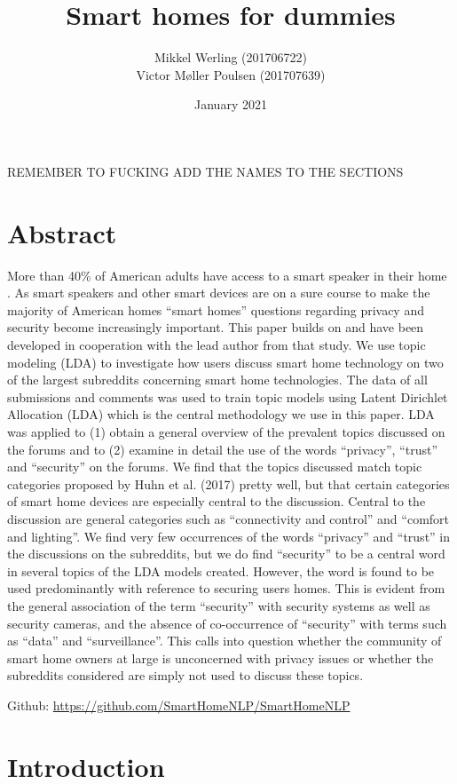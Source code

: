 \documentclass{article}
\title{Smart homes for dummies}
\author{Mikkel Werling (201706722) \\ Victor Møller Poulsen (201707639)}
\date{January 2021}
\begin{document}
    \maketitle
    REMEMBER TO FUCKING ADD THE NAMES TO THE SECTIONS 
    \section{Abstract}
    More than 40\% of American adults have access to a smart speaker in their home \cite{perez_smart_2018}. As smart speakers and other smart devices are on a sure course to make the majority of American homes “smart homes” questions regarding privacy and security become increasingly important. This paper builds on  and have been developed in cooperation with the lead author from that study. We use topic modeling (LDA) to investigate how users discuss smart home technology on two of the largest subreddits concerning smart home technologies. The data of all submissions and comments was used to train topic models using Latent Dirichlet Allocation (LDA) which is the central methodology we use in this paper. LDA was applied to (1) obtain a general overview of the prevalent topics discussed on the forums and to (2) examine in detail the use of the words “privacy”, “trust” and “security” on the forums. We find that the topics discussed match topic categories proposed by Huhn et al. (2017) pretty well, but that certain categories of smart home devices are especially central to the discussion. Central to the discussion are general categories such as “connectivity and control” and “comfort and lighting”. We find very few occurrences of the words “privacy” and “trust” in the discussions on the subreddits, but we do find “security” to be a central word in several topics of the LDA models created. However, the word is found to be used predominantly with reference to securing users homes. This is evident from the general association of the term “security” with security systems as well as security cameras, and the absence of co-occurrence of “security” with terms such as “data” and “surveillance”. This calls into question whether the community of smart home owners at large is unconcerned with privacy issues or whether the subreddits considered are simply not used to discuss these topics.

    \begin{center}
    Github: \url{https://github.com/SmartHomeNLP/SmartHomeNLP}
\end{center}

    \section{Introduction}
\end{document}
